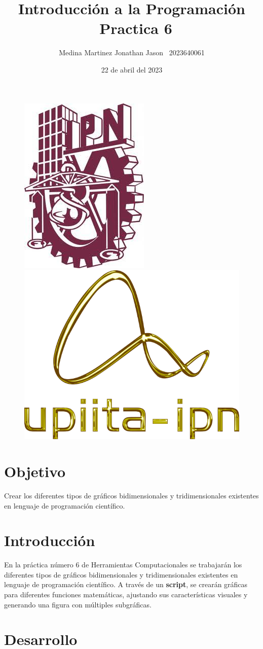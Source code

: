 \documentclass{article}
\title{Introducción a la Programación \ Practica 6}
\author{Medina Martinez Jonathan Jason \ 2023640061}
\date{22 de abril del 2023}
\begin{document}
	
	\fontsize{12}{16}\selectfont
	
	\begin{figure}[t]
		
		\includegraphics[width=2.5 cm]{Logo1.jpeg}
		\hfill
		\includegraphics[width=3 cm]{Logo2.png}
		
	\end{figure}
	
	\maketitle
	\newpage
	
	\tableofcontents
	\newpage
	
	\section{Objetivo}
	
	Crear los diferentes tipos de gráficos bidimensionales y tridimensionales existentes en lenguaje de programación científico.
	
	\section{Introducción}
	
	
	En la práctica número 6 de Herramientas Computacionales se trabajarán los diferentes tipos de gráficos bidimensionales y tridimensionales existentes en lenguaje de programación científico. A través de un \textbf{script}, se crearán gráficas para diferentes funciones matemáticas, ajustando sus características visuales y generando una figura con múltiples subgráficas. 
	
	\newpage
	\section{Desarrollo}
	
\end{document}
